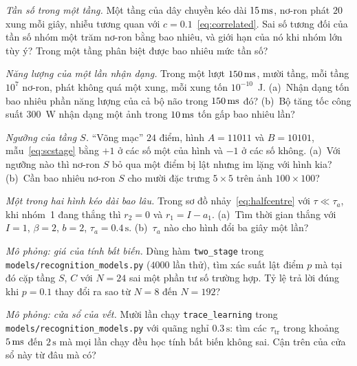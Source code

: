 \begin{exercise}[\lvlA]
\label{ex:12:1}
\emph{Tần số trong một tầng.} Một tầng của dây chuyền kéo dài $15\,\text{ms}$, nơ-ron phát $20$ xung mỗi giây, nhiễu tương quan với $c=0.1$~\eqref{eq:correlated}. Sai số tương đối của tần số nhóm một trăm nơ-ron bằng bao nhiêu, và giới hạn của nó khi nhóm lớn tùy ý? Trong một tầng phân biệt được bao nhiêu mức tần số?
\end{exercise}

\begin{exercise}[\lvlA]
\label{ex:12:2}
\emph{Năng lượng của một lần nhận dạng.} Trong một lượt $150\,\text{ms}$, mười tầng, mỗi tầng $10^7$ nơ-ron, phát không quá một xung, mỗi xung tốn $10^{-10}$~J. (a)~Nhận dạng tốn bao nhiêu phần năng lượng của cả bộ não trong $150\,\text{ms}$ đó? (b)~Bộ tăng tốc công suất $300$~W nhận dạng một ảnh trong $10\,\text{ms}$ tốn gấp bao nhiêu lần?
\end{exercise}

\begin{exercise}[\lvlB]
\label{ex:12:3}
\emph{Ngưỡng của tầng $S$.} ``Võng mạc'' $24$ điểm, hình $A=11011$ và $B=10101$, mẫu~\eqref{eq:scstage} bằng $+1$ ở các số một của hình và $-1$ ở các số không. (a)~Với ngưỡng nào thì nơ-ron $S$ bỏ qua một điểm bị lật nhưng im lặng với hình kia? (b)~Cần bao nhiêu nơ-ron $S$ cho mười đặc trưng $5\times5$ trên ảnh $100\times100$?
\end{exercise}

\begin{exercise}[\lvlB]
\label{ex:12:4}
\emph{Một trong hai hình kéo dài bao lâu.} Trong sơ đồ nhảy~\eqref{eq:halfcentre} với $\tau\ll\tau_a$, khi nhóm~1 đang thắng thì $r_2=0$ và $r_1=I-a_1$. (a)~Tìm thời gian thắng với $I=1$, $\beta=2$, $b=2$, $\tau_a=0.4\,\text{s}$. (b)~$\tau_a$ nào cho hình đổi ba giây một lần?
\end{exercise}

\begin{exercise}[\lvlB]
\label{ex:12:5}
\emph{Mô phỏng: giá của tính bất biến.} Dùng hàm \texttt{two\_stage} trong \texttt{models/\allowbreak recognition\_models.py} ($4000$ lần thử), tìm xác suất lật điểm $p$ mà tại đó cặp tầng $S$, $C$ với $N=24$ sai một phần tư số trường hợp. Tỷ lệ trả lời đúng khi $p=0.1$ thay đổi ra sao từ $N=8$ đến $N=192$?
\end{exercise}

\begin{exercise}[\lvlB]
\label{ex:12:6}
\emph{Mô phỏng: cửa sổ của vết.} Mười lần chạy \texttt{trace\_learning} trong \texttt{models/\allowbreak recognition\_models.py} với quãng nghỉ $0.3\,\text{s}$: tìm các $\tau_{\text{tr}}$ trong khoảng $5\,\text{ms}$ đến $2\,\text{s}$ mà mọi lần chạy đều học tính bất biến không sai. Cận trên của cửa sổ này từ đâu mà có?
\end{exercise}

